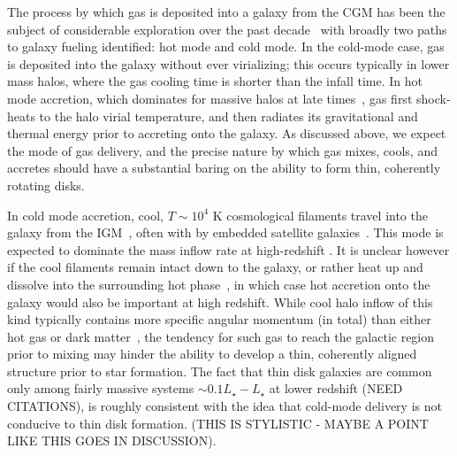\documentclass[fleqn,usenatbib]{mnras}
\begin{document}
The process by which gas is deposited into a galaxy from the CGM has been the subject of considerable exploration over the past decade~\citep[e.g.][]{Keres2005, Dekel2006, Keres2009, Martin2019a} with broadly two paths to galaxy fueling identified: hot mode and cold mode.
In the cold-mode case, gas is deposited into the galaxy without ever virializing; this occurs typically in lower mass halos, where the gas cooling time is shorter than the infall time.
In hot mode accretion, which dominates for massive halos at late times~\citep[e.g.][]{VandeVoort2011, VandeVoort2012a, Joung2012, Murante2012, Nelson2013}, gas first shock-heats to the halo virial temperature, and then radiates its gravitational and thermal energy prior to accreting onto the galaxy.
As discussed above, we expect the mode of gas delivery, and the precise nature by which gas mixes, cools, and accretes should have a substantial baring on the ability to form thin, coherently rotating disks.  

In cold mode accretion, cool, $T \sim 10^4$ K cosmological filaments travel into the galaxy from the IGM~\cite[e.g.][]{Keres2005, Dekel2006, Keres2009, Martin2019a}, often with by embedded satellite galaxies~\citep[e.g.][]{Hafen2019, Fielding2020a}.
This mode is expected to dominate the mass inflow rate at high-redshift \citep[$z\gtrsim2$, e.g.][]{Keres2009a, Dekel2009, Huscher2020}.
It is unclear however if the cool filaments remain intact down to the galaxy, or rather heat up and dissolve into the surrounding hot phase~\citep[e.g.][]{Nelson2016, Mandelker2016, Mandelker2018, Mandelker2020a}, in which case hot accretion onto the galaxy would also be important at high redshift.
While cool halo inflow of this kind typically contains more specific angular momentum (in total) than either hot gas or dark matter~\citep{Stewart2017}, the tendency for such gas to reach the galactic region prior to mixing may hinder the ability to develop a thin, coherently aligned structure prior to star formation.
The fact that thin disk galaxies are common only among fairly massive systems $\sim 0.1 L_\star - L_\star$ at lower redshift (NEED CITATIONS), is roughly consistent with the idea that cold-mode delivery is not conducive to thin disk formation. (THIS IS STYLISTIC - MAYBE A POINT LIKE THIS GOES IN DISCUSSION).
\end{document}
